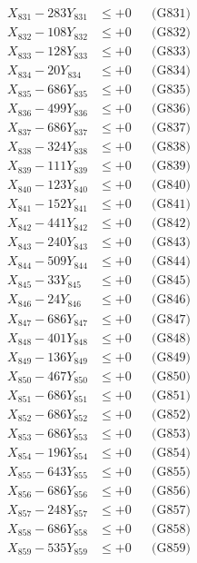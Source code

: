 \documentclass[a4paper,10pt]{article}
\begin{document}
{\begin{align}
\allowbreak
X_{831} - 283Y_{831} &\leq +0 && \text{(G831)} \\
X_{832} - 108Y_{832} &\leq +0 && \text{(G832)} \\
X_{833} - 128Y_{833} &\leq +0 && \text{(G833)} \\
X_{834} - 20Y_{834} &\leq +0 && \text{(G834)} \\
X_{835} - 686Y_{835} &\leq +0 && \text{(G835)} \\
X_{836} - 499Y_{836} &\leq +0 && \text{(G836)} \\
X_{837} - 686Y_{837} &\leq +0 && \text{(G837)} \\
X_{838} - 324Y_{838} &\leq +0 && \text{(G838)} \\
X_{839} - 111Y_{839} &\leq +0 && \text{(G839)} \\
X_{840} - 123Y_{840} &\leq +0 && \text{(G840)} \\
\allowbreak
X_{841} - 152Y_{841} &\leq +0 && \text{(G841)} \\
X_{842} - 441Y_{842} &\leq +0 && \text{(G842)} \\
X_{843} - 240Y_{843} &\leq +0 && \text{(G843)} \\
X_{844} - 509Y_{844} &\leq +0 && \text{(G844)} \\
X_{845} - 33Y_{845} &\leq +0 && \text{(G845)} \\
X_{846} - 24Y_{846} &\leq +0 && \text{(G846)} \\
X_{847} - 686Y_{847} &\leq +0 && \text{(G847)} \\
X_{848} - 401Y_{848} &\leq +0 && \text{(G848)} \\
X_{849} - 136Y_{849} &\leq +0 && \text{(G849)} \\
X_{850} - 467Y_{850} &\leq +0 && \text{(G850)} \\
\allowbreak
X_{851} - 686Y_{851} &\leq +0 && \text{(G851)} \\
X_{852} - 686Y_{852} &\leq +0 && \text{(G852)} \\
X_{853} - 686Y_{853} &\leq +0 && \text{(G853)} \\
X_{854} - 196Y_{854} &\leq +0 && \text{(G854)} \\
X_{855} - 643Y_{855} &\leq +0 && \text{(G855)} \\
X_{856} - 686Y_{856} &\leq +0 && \text{(G856)} \\
X_{857} - 248Y_{857} &\leq +0 && \text{(G857)} \\
X_{858} - 686Y_{858} &\leq +0 && \text{(G858)} \\
X_{859} - 535Y_{859} &\leq +0 && \text{(G859)} \\

\end{align}}
\end{document}
